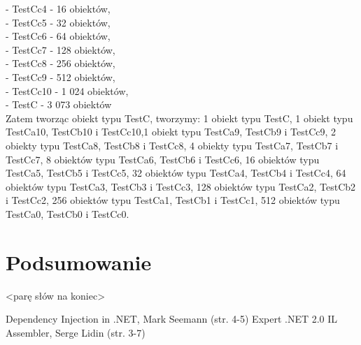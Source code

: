 \documentclass[12pt]{article}
\begin{document}
- TestCc4 - 16 obiektów,\\
- TestCc5 - 32 obiektów,\\
- TestCc6 - 64 obiektów,\\
- TestCc7 - 128 obiektów,\\
- TestCc8 - 256 obiektów,\\
- TestCc9 - 512 obiektów,\\
- TestCc10 - 1 024 obiektów,\\
- TestC - 3 073 obiektów\\
Zatem tworząc obiekt typu TestC, tworzymy: 1 obiekt typu TestC, 1 obiekt typu TestCa10, TestCb10 i TestCc10,1 obiekt typu TestCa9, TestCb9 i TestCc9, 2 obiekty typu TestCa8, TestCb8 i TestCc8, 4 obiekty typu TestCa7, TestCb7 i TestCc7, 8 obiektów typu TestCa6, TestCb6 i TestCc6, 16 obiektów typu TestCa5, TestCb5 i TestCc5, 32 obiektów typu TestCa4, TestCb4 i TestCc4, 64 obiektów typu TestCa3, TestCb3 i TestCc3, 128 obiektów typu TestCa2, TestCb2 i TestCc2, 256 obiektów typu TestCa1, TestCb1 i TestCc1, 512 obiektów typu TestCa0, TestCb0 i TestCc0.


\section{Podsumowanie}
<parę słów na koniec>

\newpage
\begin{thebibliography}{authordate1}
 Dependency Injection in .NET, Mark Seemann (str. 4-5)
 Expert .NET 2.0 IL Assembler, Serge Lidin (str. 3-7)
\end{thebibliography}
\end{document}
